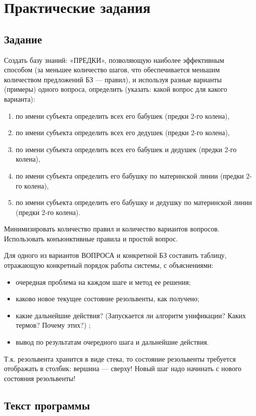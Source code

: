 \chapter{Практические задания}

\section{Задание}

Создать базу знаний: «ПРЕДКИ», позволяющую наиболее эффективным способом (за
меньшее количество шагов, что обеспечивается меньшим количеством предложений БЗ
--- правил), и используя разные варианты (примеры) одного вопроса, определить
(указать: какой вопрос для какого варианта):
\begin{enumerate}
    \item по имени субъекта определить всех его бабушек (предки 2-го колена),
    \item по имени субъекта определить всех его дедушек (предки 2-го колена),
    \item по имени субъекта определить всех его бабушек и дедушек (предки 2-го
        колена),
    \item по имени субъекта определить его бабушку по материнской линии (предки
        2-го колена),
    \item по имени субъекта определить его бабушку и дедушку по материнской
        линии (предки 2-го колена).
\end{enumerate}

Минимизировать количество правил и количество вариантов вопросов. Использовать
конъюнктивные правила и простой вопрос.

Для одного из вариантов ВОПРОСА и конкретной БЗ составить таблицу,
отражающую конкретный порядок работы системы, с объяснениями:

\begin{itemize}
    \item очередная проблема на каждом шаге и метод ее решения;
    \item каково новое текущее состояние резольвенты, как получено;
    \item какие дальнейшие действия? (Запускается ли алгоритм унификации? Каких
        термов?  Почему этих?) ;
    \item вывод по результатам очередного шага и дальнейшие действия.
\end{itemize}

Т.к. резольвента хранится в виде стека, то состояние резольвенты требуется
отображать в столбик: вершина --- сверху! Новый шаг надо начинать с нового
состояния резольвенты!

\clearpage
\section{Текст программы}


